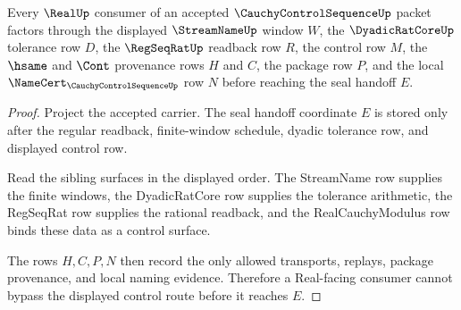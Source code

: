 \begin{theorem}
\label{thm:cauchy-control-sequence-real-seal-handoff}
Every $\RealUp$ consumer of an accepted $\CauchyControlSequenceUp$ packet factors through the displayed $\StreamNameUp$ window $W$, the $\DyadicRatCoreUp$ tolerance row $D$, the $\RegSeqRatUp$ readback row $R$, the control row $M$, the $\hsame$ and $\Cont$ provenance rows $H$ and $C$, the package row $P$, and the local $\NameCert_{\CauchyControlSequenceUp}$ row $N$ before reaching the seal handoff $E$.
\end{theorem}
\begin{proof}
Project the accepted carrier. The seal handoff coordinate $E$ is stored only after the regular readback, finite-window schedule, dyadic tolerance row, and displayed control row.

Read the sibling surfaces in the displayed order. The StreamName row supplies the finite windows, the DyadicRatCore row supplies the tolerance arithmetic, the RegSeqRat row supplies the rational readback, and the RealCauchyModulus row binds these data as a control surface.

The rows $H,C,P,N$ then record the only allowed transports, replays, package provenance, and local naming evidence. Therefore a Real-facing consumer cannot bypass the displayed control route before it reaches $E$.
\end{proof}

\begin{closurestatus}{\CauchyControlSequenceUp}
  \theoryclosure{\seedClosure}
  \formalstatus{\unformalizedV}
\end{closurestatus}

